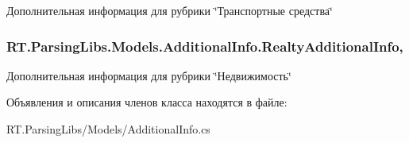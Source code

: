 Дополнительная информация для рубрики \char`\"{}Транспортные средства\char`\"{} 

\hypertarget{class_r_t_1_1_parsing_libs_1_1_models_1_1_additional_info_a61bdaef5c84d0e7804052bf4edf7ac86}{
\subsubsection[{Realty\+Additional\+Info}]{ R\+T.\+Parsing\+Libs.\+Models.\+Additional\+Info.\+Realty\+Additional\+Info\hspace{0.3cm}{\ttfamily [get]}, {\ttfamily [set]}}}\label{class_r_t_1_1_parsing_libs_1_1_models_1_1_additional_info_a61bdaef5c84d0e7804052bf4edf7ac86}


Дополнительная информация для рубрики \char`\"{}Недвижимость\char`\"{} 



Объявления и описания членов класса находятся в файле\+:\begin{DoxyCompactItemize}
\item 
R\+T.\+Parsing\+Libs/\+Models/Additional\+Info.\+cs\end{DoxyCompactItemize}
